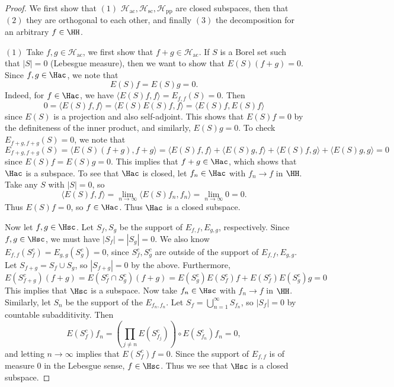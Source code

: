 \begin{proof}
  We first show that $(1)$ $\mathcal{H}_{\mathrm{ac}}, \mathcal{H}_{\mathrm{sc}}, \mathcal{H}_{\mathrm{pp}}$ are closed
  subspaces, then that $(2)$ they are orthogonal to each
  other, and finally $(3)$ the decomposition for
  an arbitrary $f \in \HH$.

  $(1)$ Take $f, g \in \mathcal{H}_{\mathrm{ac}}$,
  we first show that $f + g \in \mathcal{H}_{\mathrm{ac}}$.
  If $S$ is a Borel set such that $|S| = 0$ (Lebesgue
  measure), then we want to show that
  $E(S)(f + g) = 0$. Since $f, g \in \Hac$, we note that
  \[
    E(S)f = E(S)g = 0.
  \]
  Indeed, for $f \in \Hac$, we have
  $\langle E(S) f, f \rangle = E_{f, f}(S) = 0$. Then
  \[
    0 = \langle E(S) f, f \rangle = \langle E(S) E(S) f, f \rangle
    = \langle E(S) f , E(S) f \rangle
  \]
  since $E(S)$ is a projection and also
  self-adjoint. This shows that $E(S)f = 0$ by the
  definiteness of the inner product, and
  similarly, $E(S) g = 0$.
  To check $E_{f + g, f + g}(S) = 0$, we note that
  \[
    E_{f + g, f + g}(S) = \langle E(S) (f + g), f + g \rangle
    = \langle E(S) f, f \rangle + \langle E(S) g, f \rangle
    + \langle E(S) f, g \rangle + \langle E(S) g, g \rangle
    = 0
  \]
  since $E(S) f = E(S) g = 0$. This implies
  that $f + g \in \Hac$, which shows that
  $\Hac$ is a subspace. To see that $\Hac$ is
  closed,
  let $f_n \in \Hac$ with $f_n \to f$ in $\HH$.
  Take any $S$ with $|S| = 0$, so
  \[
    \langle E(S)f, f \rangle
    =
    \lim_{n \to \infty} \langle E(S) f_n, f_n \rangle =
    \lim_{n \to \infty} 0 = 0.
  \]
  Thus $E(S) f = 0$, so $f \in \Hac$. Thus
  $\Hac$ is a closed subspace.

  Now let $f, g \in \Hsc$. Let $S_f, S_g$ be the support
  of $E_{f, f}, E_{g, g}$, respectively. Since
  $f, g \in \Hsc$, we must have $|S_f| = |S_g| = 0$.
  We also know $E_{f, f}(S_f^c) = E_{g, g}(S_g^c) = 0$,
  since $S_f^c, S_g^c$ are outside of the support
  of $E_{f, f}, E_{g, g}$. Let
  $S_{f + g} = S_f \cup S_g$, so
  $|S_{f + g}| = 0$ by the above. Furthermore,
  \[
    E(S_{f + g}^c)(f + g)
    = E(S_f^c \cap S_g^c)(f + g)
    = E(S_g^c) E(S_f^c) f + E(S_f^c) E(S_g^c) g
    = 0
  \]
  This implies that $\Hsc$ is a subspace.
  Now take $f_n \in \Hsc$ with $f_n \to f$ in $\HH$.
  Similarly, let $S_n$ be the support of the $E_{f_n, f_n}$.
  Let $S_f = \bigcup_{n = 1}^\infty S_{f_n}$, so
  $|S_f| = 0$ by countable subadditivity. Then
  \[
    E(S_f^c) f_n
    = \left(\prod_{j \ne n} E(S^c_{f_j})\right) \circ E(S_{f_n}^c) f_n
    = 0,
  \]
  and letting $n \to \infty$ implies that
  $E(S_f^c) f = 0$. Since the support of $E_{f, f}$ is
  of measure $0$ in the Lebesgue sense,
  $f \in \Hsc$.
  Thus we see that $\Hsc$ is a closed subspace.


\end{proof}
